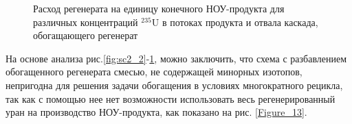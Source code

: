 \begin{figure}[ht]
  \caption{Расход регенерата на единицу конечного НОУ-продукта для различных концентраций $^{235}$U в потоках продукта и отвала каскада, обогащающего регенерат}\label{Figure_10}
\end{figure}



На основе анализа рис.\ref{fig:sc2_2}-\ref{Figure_10}, можно заключить, что схема с разбавлением обогащенного регенерата смесью, не содержащей минорных изотопов, непригодна для решения задачи обогащения в условиях многократного рецикла, так как с помощью нее нет возможности использовать весь регенерированный уран на производство НОУ-продукта, как показано на рис. \ref{Figure_13}.

